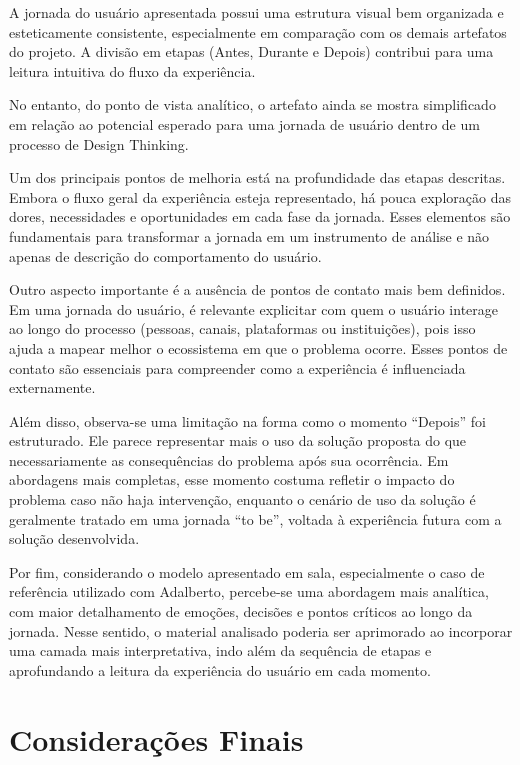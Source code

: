 \documentclass[
  sigconf,
  nonacm, %
  language=portuguese
]{acmart}
\begin{document}
A jornada do usuário apresentada possui uma estrutura visual bem organizada e esteticamente consistente, especialmente em comparação com os demais artefatos do projeto. A divisão em etapas (Antes, Durante e Depois) contribui para uma leitura intuitiva do fluxo da experiência.

No entanto, do ponto de vista analítico, o artefato ainda se mostra simplificado em relação ao potencial esperado para uma jornada de usuário dentro de um processo de Design Thinking.

Um dos principais pontos de melhoria está na profundidade das etapas descritas. Embora o fluxo geral da experiência esteja representado, há pouca exploração das dores, necessidades e oportunidades em cada fase da jornada. Esses elementos são fundamentais para transformar a jornada em um instrumento de análise e não apenas de descrição do comportamento do usuário.

Outro aspecto importante é a ausência de pontos de contato mais bem definidos. Em uma jornada do usuário, é relevante explicitar com quem o usuário interage ao longo do processo (pessoas, canais, plataformas ou instituições), pois isso ajuda a mapear melhor o ecossistema em que o problema ocorre. Esses pontos de contato são essenciais para compreender como a experiência é influenciada externamente.

Além disso, observa-se uma limitação na forma como o momento “Depois” foi estruturado. Ele parece representar mais o uso da solução proposta do que necessariamente as consequências do problema após sua ocorrência. Em abordagens mais completas, esse momento costuma refletir o impacto do problema caso não haja intervenção, enquanto o cenário de uso da solução é geralmente tratado em uma jornada “to be”, voltada à experiência futura com a solução desenvolvida.

Por fim, considerando o modelo apresentado em sala, especialmente o caso de referência utilizado com Adalberto, percebe-se uma abordagem mais analítica, com maior detalhamento de emoções, decisões e pontos críticos ao longo da jornada. Nesse sentido, o material analisado poderia ser aprimorado ao incorporar uma camada mais interpretativa, indo além da sequência de etapas e aprofundando a leitura da experiência do usuário em cada momento.

\section{Considerações Finais}
\end{document}
